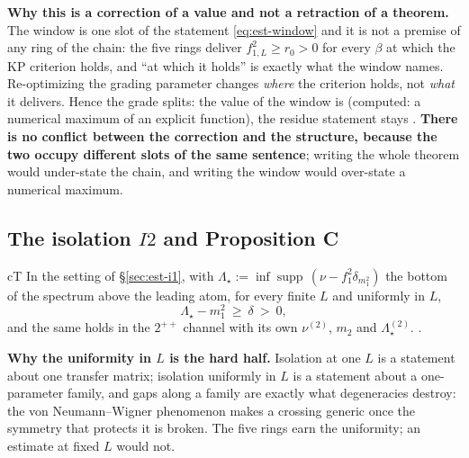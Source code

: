 \begin{qbox}
\textbf{Why this is a correction of a value and not a retraction of a theorem.} The window is one
slot of the statement \eqref{eq:est-window} and it is not a premise of any ring of the chain: the
five rings \LT{} deliver $f^2_{1,L}\ge r_0>0$ for every $\beta$ at which the KP criterion holds, and
``at which it holds'' is exactly what the window names. Re-optimizing the grading parameter changes
\emph{where} the criterion holds, not \emph{what} it delivers. Hence the grade splits: the value of
the window is \LC{} (computed: a numerical maximum of an explicit function), the residue statement
stays \LT. \textbf{There is no conflict between the correction and the \LT{} structure, because the
two occupy different slots of the same sentence}; writing the whole theorem \LC{} would under-state
the chain, and writing the window \LT{} would over-state a numerical maximum.
\end{qbox}

\subsection{The isolation \texorpdfstring{$I2$}{I2} and Proposition C}
\label{sec:est-i2}

\begin{claimbox}{cT}
 In the setting of \S\ref{sec:est-i1}, with
$\Lambda_\star:=\inf\operatorname{supp}\,(\nu-f_1^2\delta_{m_1^2})$ the bottom of the spectrum above
the leading atom, for every finite $L$ and uniformly in $L$,
\begin{equation}
\Lambda_\star-m_1^2\ \ge\ \delta\ >\ 0 ,
\label{eq:est-i2}
\end{equation}
and the same holds in the $2^{++}$ channel with its own $\nu^{(2)}$, $m_2$ and
$\Lambda^{(2)}_\star$. \LT.
\end{claimbox}

\noindent\textbf{Why the uniformity in $L$ is the hard half.} Isolation at one $L$ is a statement
about one transfer matrix; isolation uniformly in $L$ is a statement about a one-parameter family,
and gaps along a family are exactly what degeneracies destroy: the von Neumann--Wigner phenomenon
\cite{vnw} makes a crossing generic once the symmetry that protects it is broken. The five rings earn
the uniformity; an estimate at fixed $L$ would not.

